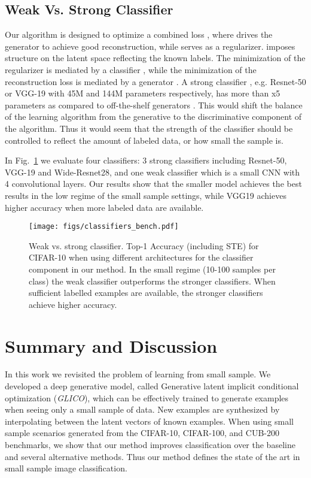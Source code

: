 \documentclass[a4paper,conference]{IEEEtran}
\begin{document}
\subsection{Weak Vs. Strong Classifier}
\label{sec:weak-vs-strong}

Our algorithm is designed to optimize a combined loss , where  drives the generator to achieve good reconstruction, while  serves as a regularizer.  imposes structure on the latent space reflecting the known labels. The minimization of the regularizer  is mediated by a classifier , while the minimization of the reconstruction loss  is mediated by a generator . A strong classifier , e.g. Resnet-50 or VGG-19 with 45M and 144M parameters respectively, has more than x5 parameters as compared to off-the-shelf generators . This would shift the balance of the learning algorithm from the generative to the discriminative component of the algorithm. Thus it would seem that the strength of the classifier   should be controlled to reflect the amount of labeled data, or how small the sample is. 

In Fig.~\ref{fig: classifiers} we evaluate four classifiers: 3 strong classifiers including Resnet-50, VGG-19 and Wide-Resnet28, and one weak classifier which is a small CNN with 4 convolutional layers. Our results show that the smaller model achieves the best results  in the low regime of the small sample settings, while VGG19 achieves higher accuracy when more labeled data are available.

\begin{figure}[htbp]
	\vskip -0.2in
	\centerline
{\texttt{[image: figs/classifiers\_bench.pdf]}}

	\caption{Weak vs. strong classifier. Top-1 Accuracy (including STE) for  CIFAR-10 when using different architectures for the classifier component in our method. In the small regime (10-100 samples per class) the weak classifier outperforms the stronger classifiers. When sufficient labelled examples are available, the stronger classifiers achieve higher accuracy.   }
	\label{fig: classifiers}
	\vskip -0.1in
\end{figure}

		

		
\section{Summary and Discussion}

In this work we revisited the problem of learning from small sample. We developed a deep generative model, called Generative latent implicit conditional optimization (\textit{GLICO}), which can be effectively trained to generate examples when seeing only a small sample of data. New examples are synthesized by interpolating between the latent vectors of known examples. When using small sample scenarios generated from the CIFAR-10, CIFAR-100, and CUB-200 benchmarks, we show that our method improves classification over the baseline and several alternative methods. Thus our method defines the state of the art in small sample image classification.
\end{document}
